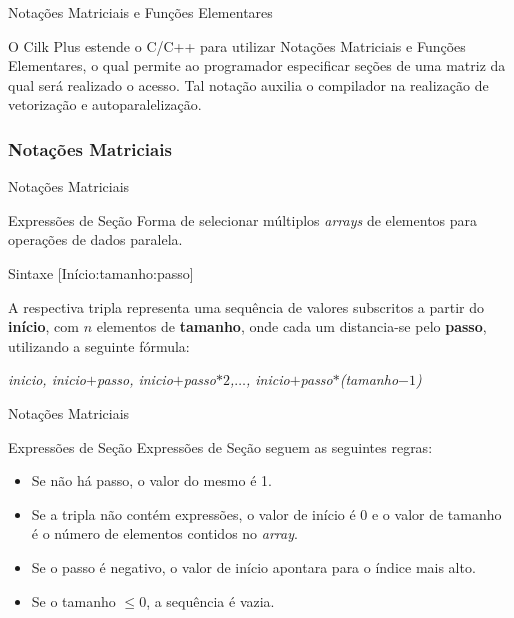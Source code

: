 \documentclass{beamer}
\begin{document}
\begin{frame}{Notações Matriciais e Funções Elementares}
\begin{block}{}
\centering
    O Cilk Plus estende o C/C++ para utilizar Notações Matriciais e Funções 
    Elementares, o qual permite ao programador especificar seções de uma matriz 
    da qual será realizado o acesso. Tal notação auxilia o compilador na 
    realização de vetorização e autoparalelização.
\end{block}
\end{frame}

\subsubsection{Notações Matriciais}
\begin{frame}{Notações Matriciais}
\begin{block}{Expressões de Seção}
    Forma de selecionar múltiplos \textit{arrays} de elementos para operações de dados paralela.
\begin{block}{Sintaxe}
    [Início:tamanho:passo]
\end{block}
    A respectiva tripla representa uma sequência de valores subscritos a partir 
    do \textbf{início}, com $n$ elementos de \textbf{tamanho}, onde cada um 
    distancia-se pelo \textbf{passo}, utilizando a seguinte fórmula:
\begin{block}{}
    \centering
    \textit{inicio, inicio$+$passo, inicio$+$passo$*2$,$\ldots$, inicio$+$passo$*$(tamanho$-1$)}
\end{block}
\end{block}

\end{frame}

\begin{frame}{Notações Matriciais}
\begin{block}{Expressões de Seção}
    Expressões de Seção seguem as seguintes regras:
    \begin{itemize}
	    \item Se não há passo, o valor do mesmo é 1.
	    \item Se a tripla não contém expressões, o valor de início é $0$ e o 
	    valor de tamanho é o número de elementos contidos no \textit{array}.
	    \item Se o passo é negativo, o valor de início apontara para o índice mais alto.
	    \item Se o tamanho $\leq 0$, a sequência é vazia.
    \end{itemize}
\end{block}

\end{frame}
\end{document}
